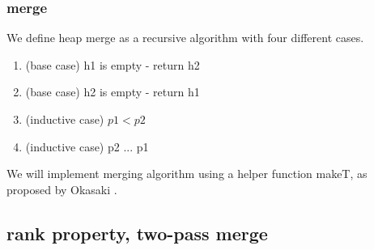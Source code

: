 \subsubsection{merge}

We define heap merge as a recursive algorithm with four different cases.

\begin{enumerate}
 \item (base case) h1 is empty - return h2
 \item (base case) h2 is empty - return h1
 \item (inductive case) $p1 < p2$
 \item (inductive case) p2 ... p1
\end{enumerate}

We will implement merging algorithm using a helper function makeT, as proposed by Okasaki \cite{Oka99}.

\subsection{rank property, two-pass merge}\label{sec:rank-property}